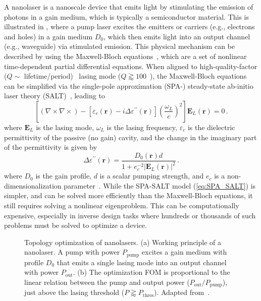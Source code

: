 A nanolaser is a nanoscale device that emits light by stimulating the emission of photons in a gain medium, which is typically a semiconductor material. This is illustrated
in , where a pump laser excites the emitters or carriers (e.g., electrons and holes) in a gain medium $D_0$, which then emits light into an output channel (e.g., waveguide) via
stimulated emission. This physical
mechanism can be described by using the Maxwell-Bloch equations~\cite{haken_laser_dynamics, PhysRev.134.A1429, SALT_original}, which are a set of nonlinear time-dependent 
partial differential equations. When aligned to high-quality-factor ($Q \sim$ lifetime/period)~\cite{phot_crys} lasing mode ($Q\gtrapprox 100$~\cite{cerjan_2016}), the Maxwell-Bloch equations can be simplified via the single-pole approximation (SPA-) steady-state ab-initio laser theory (SALT)~\cite{Ge_2010}, leading to
\begin{equation}\label{eq:SPA_SALT}
    \left[(\nabla \times 
     \nabla \times ) -\left[\varepsilon_c(\mathbf{r})-i \Delta \varepsilon^{\prime \prime} (\mathbf{r})\right] \left(\frac{\omega_L}{c}\right)^2\right] \mathbf{E}_L(\mathbf{r})=0\,.
\end{equation}
where $\mathbf{E}_L$ is the lasing mode, $\omega_L$ is the lasing frequency, $\varepsilon_c$ is the dielectric permittivity of the passive (no gain) cavity, and the change in the 
imaginary part of the permittivity is given by
\begin{equation}\label{eq:gain_SALT}
        \Delta \varepsilon^{\prime \prime} (\mathbf{r}) =  \frac{D_0(\mathbf{r}) d}{1+ e_c^{-2}\left|\mathbf{E}_L(\mathbf{r})\right|^2}\,.
\end{equation}
where $D_0$ is the gain profile, $d$ is a scalar pumping strength, and $e_c$ is a non-dimensionalization parameter~\cite{Ge_2010}. While the SPA-SALT model (\eqref{eq:SPA_SALT}) 
is simpler, and can be solved more efficiently than the Maxwell-Bloch equations, it still requires solving a nonlinear eigenproblem. This can be computationally expensive, especially in 
inverse design tasks where hundreds or thousands of such problems must be solved to optimize a device.

\begin{figure}[tb]
    \centering
    \caption{Topology optimization of nanolasers. (a) Working principle of a nanolaser. A pump with power $P_\text{pump}$ excites a gain medium with profile
    $D_0$ that emits a single lasing mode into an output channel with power $P_\text{out}$. (b) The optimization FOM is proportional to the linear relation between the pump and output power ($P_\text{out}/P_\text{pump}$),
    just above the lasing threshold ($P \gtrapprox P_\text{thres}$).  Adapted from~\cite{ownpub4}.}
    \label{fig:laser2d}
\end{figure}

